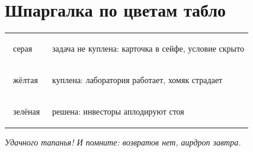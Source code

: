 \documentclass[12pt,a4paper]{article}
\begin{document}
\section*{Шпаргалка по цветам табло}

\begin{center}
\begin{tabular}{ll}
\toprule
\colorbox{gray!30}{\strut ~серая~}   & задача не куплена: карточка в сейфе, условие скрыто \\
\colorbox{yellow!60}{\strut ~жёлтая~} & куплена: лаборатория работает, хомяк страдает \\
\colorbox{green!40}{\strut ~зелёная~} & решена: инвесторы аплодируют стоя \\
\bottomrule
\end{tabular}
\end{center}

\vspace{1em}
\begin{center}
\emph{Удачного тапанья! И помните: возвратов нет, аирдроп завтра.}
\end{center}
\end{document}
